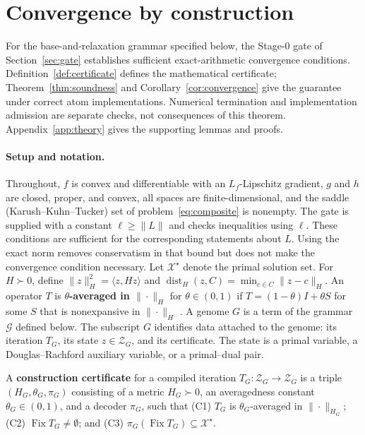 \section{Convergence by construction}
\label{sec:theory}

For the base-and-relaxation grammar specified below, the Stage-0 gate of
Section~\ref{sec:gate} establishes sufficient exact-arithmetic convergence
conditions. Definition~\ref{def:certificate} defines the mathematical
certificate; Theorem~\ref{thm:soundness} and Corollary~\ref{cor:convergence}
give the guarantee under correct atom implementations. Numerical termination
and implementation admission are separate checks, not consequences of this
theorem.
Appendix~\ref{app:theory} gives the supporting lemmas and proofs.

\paragraph{Setup and notation.}
Throughout, $f$ is convex and differentiable with an $L_f$-Lipschitz
gradient, $g$ and $h$ are closed, proper, and convex, all spaces are
finite-dimensional, and the saddle (Karush--Kuhn--Tucker) set of
problem~\eqref{eq:composite} is nonempty. The gate is supplied with a
constant $\ell\geq\|L\|$ and checks inequalities using $\ell$. These conditions
are sufficient for the corresponding statements about $L$. Using the exact
norm removes conservatism in that bound but does not make the convergence
condition necessary. Let $\mathcal X^\star$ denote the primal solution set. For
$H\succ0$, define
$\|z\|_H^2=\langle z,Hz\rangle$ and
$\operatorname{dist}_H(z,C)=\min_{c\in C}\|z-c\|_H$. An operator $T$ is
\textbf{$\theta$-averaged in $\|\cdot\|_H$} for $\theta\in(0,1)$ if
$T=(1-\theta)I+\theta S$ for some $S$ that is nonexpansive in $\|\cdot\|_H$
\citep[\S2.3 and \S2.8]{RyuYin2022LargeScale}. A genome $G$ is a term of
the grammar $\mathcal G$ defined below. The subscript $G$ identifies data
attached to the genome: its iteration $T_G$, its state
$z\in\mathcal Z_G$, and its certificate. The state is a primal variable, a
Douglas--Rachford auxiliary variable, or a primal--dual pair.

\begin{definition}
\label{def:certificate}
A \textbf{construction certificate} for a compiled iteration
$T_G:\mathcal Z_G\to\mathcal Z_G$ is a triple $(H_G,\theta_G,\pi_G)$ consisting
of a metric $H_G\succ0$, an averagedness constant $\theta_G\in(0,1)$, and a
decoder $\pi_G$, such that
(C1) $T_G$ is $\theta_G$-averaged in $\|\cdot\|_{H_G}$;
(C2) $\operatorname{Fix}T_G\neq\emptyset$; and
(C3) $\pi_G(\operatorname{Fix}T_G)\subseteq\mathcal X^\star$.
\end{definition}

